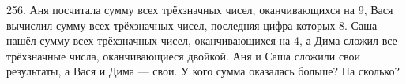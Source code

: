 256. Аня посчитала сумму всех трёхзначных чисел, оканчивающихся на 9, Вася вычислил сумму всех трёхзначных чисел, последняя цифра которых 8. Саша нашёл сумму всех трёхзначных чисел, оканчивающихся на 4, а Дима сложил все трёхзначные числа, оканчивающиеся двойкой. Аня и Саша сложили свои результаты, а Вася и Дима --- свои. У кого сумма оказалась больше? На сколько?\\
